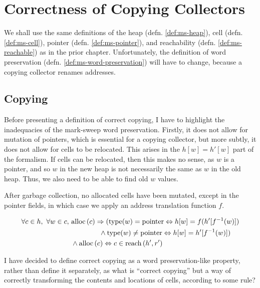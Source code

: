 \chapter{Correctness of Copying Collectors}
\label{sec:copying}

We shall use the same definitions of the \gls{heap}
(defn. \ref{def:ms-heap}), \gls{cell} (defn. \ref{def:ms-cell}),
\gls{pointer} (defn. \ref{def:ms-pointer}), and reachability
(defn. \ref{def:ms-reachable}) as in the prior chapter. Unfortunately,
the definition of word preservation
(defn. \ref{def:ms-word-preservation}) will have to change, because a
\gls{copying} \gls{collector} renames addresses.

\section{Copying}
\label{sec:copying-copying}

Before presenting a definition of correct copying, I have to highlight
the inadequacies of the \gls{mark-sweep} word preservation. Firstly,
it does not allow for mutation of \glspl{pointer}, which is essential
for a \gls{copying} \gls{collector}, but more subtly, it does not
allow for \glspl{cell} to be relocated. This arises in the $h[w] =
h'[w]$ part of the formalism. If \glspl{cell} can be relocated, then
this makes no sense, as $w$ is a \gls{pointer}, and so $w$ in the new
\gls{heap} is not necessarily the same as $w$ in the old
\gls{heap}. Thus, we also need to be able to find old $w$ values.

\begin{definition}
  \label{def:c-correct-copying}
  After garbage collection, no allocated cells have been mutated,
  except in the pointer fields, in which case we apply an address
  translation function $f$.

  \begin{align*}
    \forall c \in h,\ \forall w \in c,\ &\mathrm{alloc}\left(c\right) \Rightarrow
    (\mathrm{type}(w) = \mathrm{pointer} \Leftrightarrow h[w] = f(h'[f^{-1}(w)])\\
    &\quad\quad\quad\quad \land \mathrm{type}(w) \neq \mathrm{pointer}
    \Leftrightarrow h[w] = h'[f^{-1}(w)])\\
    &\land \mathrm{alloc}\left(c\right) \Leftrightarrow c \in \mathrm{reach}\left(h', r'\right)
  \end{align*}
\end{definition}

I have decided to define correct copying as a word preservation-like
property, rather than define it separately, as what is ``correct
copying'' but a way of correctly transforming the contents and
locations of \glspl{cell}, according to some rule?

